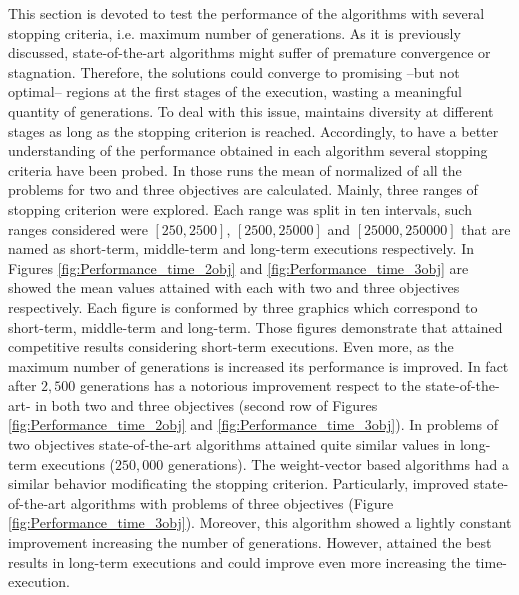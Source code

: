 This section is devoted to test the performance of the algorithms with several stopping criteria, i.e. maximum number of generations.
%
As it is previously discussed, state-of-the-art algorithms might suffer of premature convergence or stagnation.
%
Therefore, the solutions could converge to promising --but not optimal-- regions at the first stages of the execution, wasting a meaningful quantity of generations.
%
To deal with this issue, \VSDMOEA{} maintains diversity at different stages as long as the stopping criterion is reached.
%
Accordingly, to have a better understanding of the performance obtained in each algorithm several stopping criteria have been probed.
%
In those runs the mean of normalized \HV{} of all the problems for two and three objectives are calculated.
%
Mainly, three ranges of stopping criterion were explored.
%
Each range was split in ten intervals, such ranges considered were $[250, 2500]$, $[2500, 25000]$ and $[25000, 250000]$ that are named as short-term, middle-term and long-term executions respectively.
%
In Figures \ref{fig:Performance_time_2obj} and \ref{fig:Performance_time_3obj} are showed the mean \HV{} values attained with each \MOEA{} with two and three objectives respectively.
%
Each figure is conformed by three graphics which correspond to short-term, middle-term and long-term.
%
Those figures demonstrate that \VSDMOEA{} attained competitive results considering short-term executions.
%
Even more, as the maximum number of generations is increased its performance is improved.
%
In fact after $2,500$ generations \VSDMOEA{} has a notorious improvement respect to the state-of-the-art-\MOEAS{} in both two and three objectives (second row of Figures \ref{fig:Performance_time_2obj} and \ref{fig:Performance_time_3obj}).
%
In problems of two objectives state-of-the-art algorithms attained quite similar \HV{} values in long-term executions ($250,000$ generations).
%
The weight-vector based algorithms had a similar behavior modificating the stopping criterion.
%
Particularly, \RMOEA{} improved state-of-the-art algorithms with problems of three objectives (Figure \ref{fig:Performance_time_3obj}).
%
Moreover, this algorithm showed a lightly constant improvement increasing the number of generations.
%
However, \VSDMOEA{} attained the best results in long-term executions and could improve even more increasing the time-execution.
%


